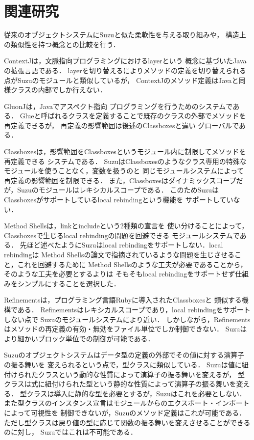 \documentclass{ipsjprosym}
\begin{document}
\section{関連研究}

従来のオブジェクトシステムにSuzuと似た柔軟性を与える取り組みや，
構造上の類似性を持つ概念との比較を行う．

ContextJ\cite{AppeltauerMalte:2011}は，文脈指向プログラミングにおけるlayerという
概念に基づいたJavaの拡張言語である．
layerを切り替えるによりメソッドの定義を切り替えられる点がSuzuのモジュールと類似しているが，
ContextJのメソッド定義はJavaと同様クラスの内部でしか行えない．

GluonJ\cite{Chiba:2010:MMC:1869459.1869503}は，Javaでアスペクト指向
プログラミングを行うためのシステムである．
Glueと呼ばれるクラスを定義することで既存のクラスの外部でメソッドを再定義できるが，
再定義の影響範囲は後述のClassboxes\cite{Bergel:2005:CCV:1646591.1646599}と違い
グローバルである．

Classboxesは，影響範囲をClassboxesというモジュール内に制限してメソッドを再定義できる
システムである．
SuzuはClassboxesのようなクラス専用の特殊なモジュールを使うことなく，変数を扱うのと
同じモジュールシステムによって再定義の影響範囲を制限できる．
また，Classboxesはダイナミックスコープだが，Suzuのモジュールはレキシカルスコープである．
このためSuzuはClassboxesがサポートしているlocal rebindingという機能を
サポートしていない．

Method Shells\cite{Takeshita:2014-07-14}は，linkとincludeという2種類の宣言を
使い分けることによって，Classboxesで生じるlocal rebindingの問題を回避できる
モジュールシステムである．
先ほど述べたようにSuzuはlocal rebindingをサポートしない．local rebindingは
Method Shellsの論文で指摘されているような問題を生じさせること，これを回避するために
Method Shellsのような工夫が必要であることから，そのような工夫を必要とするよりは
そもそもlocal rebindingをサポートせず仕組みをシンプルにすることを選択した．

Refinements\cite{Maeda:2013}は，プログラミング言語Rubyに導入されたClassboxesと
類似する機構である．
Refinementsはレキシカルスコープであり，local rebindingをサポートしない点で
Suzuのモジュールシステムにより近い．
しかしながら，Refinementsはメソッドの再定義の有効・無効をファイル単位でしか制御できない．
Suzuはより細かいブロック単位での制御が可能である．

Suzuのオブジェクトシステムはデータ型の定義の外部でその値に対する演算子の振る舞いを
変えられるという点で，型クラス\cite{Wadler:1989:MAP:75277.75283}に類似している．
Suzuは値に紐付けられたクラスという動的な性質によって演算子の振る舞いを変えるが，
型クラスは式に紐付けられた型という静的な性質によって演算子の振る舞いを変える．
型クラスは導入に静的な型を必要とするが，Suzuはこれを必要としない．
また型クラスのインスタンス宣言はモジュールからのエクスポート・インポートによって可視性を
制御できないが，Suzuのメソッド定義はこれが可能である．
ただし型クラスは戻り値の型に応じて関数の振る舞いを変えさせることができるのに対し，
Suzuではこれは不可能である．
\end{document}
